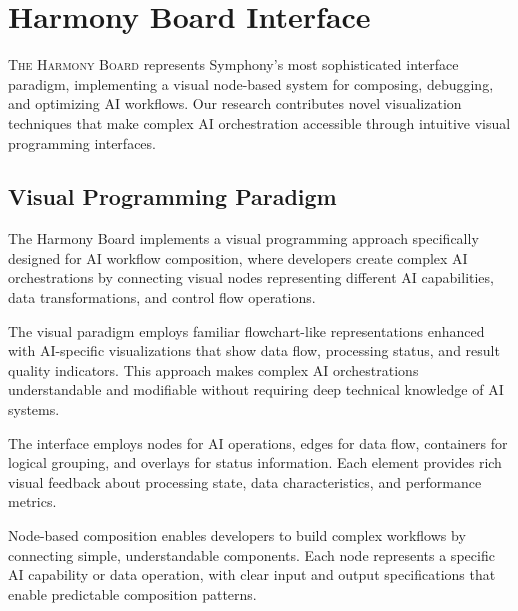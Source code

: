 
\section*{Harmony Board Interface}

\lettrine{T}{he Harmony Board} represents Symphony's most sophisticated interface paradigm, implementing a visual node-based system for composing, debugging, and optimizing AI workflows. Our research contributes novel visualization techniques that make complex AI orchestration accessible through intuitive visual programming interfaces.

\subsection*{Visual Programming Paradigm}

The Harmony Board implements a visual programming approach specifically designed for AI workflow composition, where developers create complex AI orchestrations by connecting visual nodes representing different AI capabilities, data transformations, and control flow operations.

The visual paradigm employs familiar flowchart-like representations enhanced with AI-specific visualizations that show data flow, processing status, and result quality indicators. This approach makes complex AI orchestrations understandable and modifiable without requiring deep technical knowledge of AI systems.

\begin{infobox}[title=Visual Programming Elements]
The interface employs nodes for AI operations, edges for data flow, containers for logical grouping, and overlays for status information. Each element provides rich visual feedback about processing state, data characteristics, and performance metrics.
\end{infobox}

Node-based composition enables developers to build complex workflows by connecting simple, understandable components. Each node represents a specific AI capability or data operation, with clear input and output specifications that enable predictable composition patterns.

